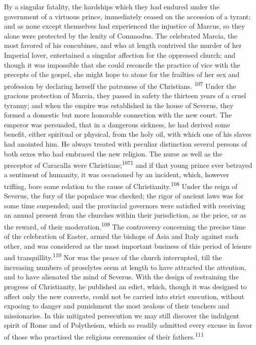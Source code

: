By a singular fatality, the hardships which they had endured
under the government of a virtuous prince, immediately ceased on
the accession of a tyrant; and as none except themselves had
experienced the injustice of Marcus, so they alone were protected
by the lenity of Commodus. The celebrated Marcia, the most
favored of his concubines, and who at length contrived the murder
of her Imperial lover, entertained a singular affection for the
oppressed church; and though it was impossible that she could
reconcile the practice of vice with the precepts of the gospel,
she might hope to atone for the frailties of her sex and
profession by declaring herself the patroness of the Christians. \textsuperscript{107}
Under the gracious protection of Marcia, they passed in
safety the thirteen years of a cruel tyranny; and when the empire
was established in the house of Severus, they formed a domestic
but more honorable connection with the new court. The emperor was
persuaded, that in a dangerous sickness, he had derived some
benefit, either spiritual or physical, from the holy oil, with
which one of his slaves had anointed him. He always treated with
peculiar distinction several persons of both sexes who had
embraced the new religion. The nurse as well as the preceptor of
Caracalla were Christians;\textsuperscript{1071} and if that young prince ever
betrayed a sentiment of humanity, it was occasioned by an
incident, which, however trifling, bore some relation to the
cause of Christianity.\textsuperscript{108} Under the reign of Severus, the fury
of the populace was checked; the rigor of ancient laws was for
some time suspended; and the provincial governors were satisfied
with receiving an annual present from the churches within their
jurisdiction, as the price, or as the reward, of their
moderation.\textsuperscript{109} The controversy concerning the precise time of
the celebration of Easter, armed the bishops of Asia and Italy
against each other, and was considered as the most important
business of this period of leisure and tranquillity.\textsuperscript{110} Nor was
the peace of the church interrupted, till the increasing numbers
of proselytes seem at length to have attracted the attention, and
to have alienated the mind of Severus. With the design of
restraining the progress of Christianity, he published an edict,
which, though it was designed to affect only the new converts,
could not be carried into strict execution, without exposing to
danger and punishment the most zealous of their teachers and
missionaries. In this mitigated persecution we may still discover
the indulgent spirit of Rome and of Polytheism, which so readily
admitted every excuse in favor of those who practised the
religious ceremonies of their fathers.\textsuperscript{111}

